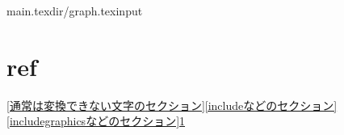\documentclass[a4paper,10pt]{jsarticle}
\begin{document}
main.texdir/graph.texinput



\section{ref}
\label{refのセクション}

\ref{通常は変換できない文字のセクション}\ref{includeなどのセクション}\ref{includegraphicsなどのセクション}\ref{refのセクション}
\end{document}
